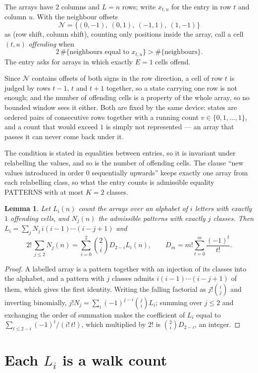 \documentclass[11pt,a4paper]{article}
\theoremstyle{plain}
\newtheorem{lemma}[theorem]{Lemma}
\theoremstyle{definition}
\begin{document}
The arrays have $2$ columns and $L=n$ rows; write $x_{t,u}$ for the entry in
row $t$ and column $u$. With the neighbour offsets
\[
\mathcal N=\{(0,-1),\ (0,1),\ (-1,1),\ (1,-1)\}
\]
as (row shift, column shift), counting only positions inside the array, call a cell
$(t,u)$ \emph{offending} when
\[
2\,\#\{\text{neighbours equal to }x_{t,u}\}>\#\{\text{neighbours}\} .
\]
The entry asks for arrays in which exactly $E=1$ cells offend.

Since $\mathcal N$ contains offsets of both signs in the row direction, a cell of row
$t$ is judged by rows $t-1$, $t$ and $t+1$ together, so a state carrying one row is not
enough; and the number of offending cells is a property of the whole array, so no bounded
window sees it either. Both are fixed by the same device: states are ordered pairs of
consecutive rows together with a running count $v\in\{0,1,\dots,1\}$, and a count that
would exceed $1$ is simply not represented --- an array that passes it can never come back
under it.

The condition is stated in equalities between entries, so it is invariant under relabelling
the values, and so is the number of offending cells. The clause ``new values introduced in
order $0$ sequentially upwards'' keeps exactly one array from each relabelling class, so what
the entry counts is admissible equality PATTERNS with at most $K=2$ classes.

\begin{lemma}\label{lem:inv}
Let $L_i(n)$ count the arrays over an alphabet of $i$ letters with exactly $1$ offending
cells, and $N_j(n)$ the admissible patterns with exactly $j$ classes. Then
$L_i=\sum_j N_j\,i(i-1)\cdots(i-j+1)$ and
\[
2!\,\sum_{j\le2}N_j(n)=\sum_{i=0}^{2}\binom{2}{i}D_{2-i}L_i(n),
\qquad D_m=m!\sum_{t=0}^{m}\frac{(-1)^t}{t!} .
\]
\end{lemma}

\begin{proof}
A labelled array is a pattern together with an injection of its classes into the alphabet,
and a pattern with $j$ classes admits $i(i-1)\cdots(i-j+1)$ of them, which gives the first
identity. Writing the falling factorial as $j!\binom{i}{j}$ and inverting binomially,
$j!N_j=\sum_i(-1)^{j-i}\binom{j}{i}L_i$; summing over $j\le2$ and exchanging the
order of summation makes the coefficient of $L_i$ equal to
$\sum_{t\le2-i}(-1)^t/(i!\,t!)$, which multiplied by $2!$ is
$\binom{2}{i}D_{2-i}$, an integer.
\end{proof}

\section{Each $L_i$ is a walk count}
\end{document}
